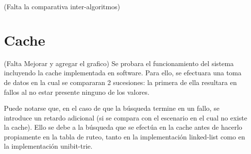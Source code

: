 (Falta la comparativa inter-algoritmos)


\newpage
\section{Cache}

(Falta Mejorar y agregar el grafico)
Se probara el funcionamiento del sistema incluyendo la cache implementada en software. Para ello, se efectuara una toma de datos en la cual se compararan 2 sucesiones: la primera de ella resultara en fallos al no estar presente ninguno de los valores.

Puede notarse que, en el caso de que la búsqueda termine en un fallo, se introduce un retardo adicional (si se compara con el escenario en el cual no existe la cache). Ello se debe a la búsqueda que se efectúa en la cache antes de hacerlo propiamente en la tabla de ruteo, tanto en la implementación linked-list como en la implementación unibit-trie.

